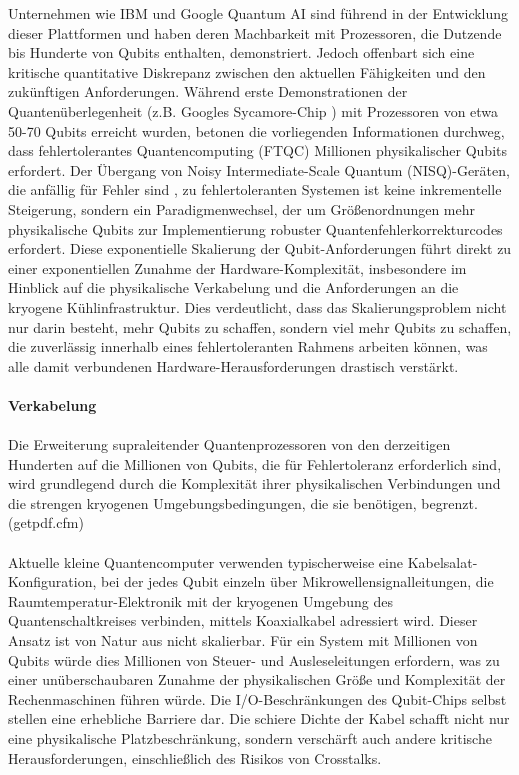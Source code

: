 Unternehmen wie IBM und Google Quantum AI sind führend in der Entwicklung dieser Plattformen und haben deren Machbarkeit mit Prozessoren, die Dutzende bis Hunderte von Qubits enthalten, demonstriert. Jedoch offenbart sich eine kritische quantitative Diskrepanz zwischen den aktuellen Fähigkeiten und den zukünftigen Anforderungen. Während erste Demonstrationen der \glqq Quantenüberlegenheit\grqq{} (z.B. Googles Sycamore-Chip ) mit Prozessoren von etwa 50-70 Qubits erreicht wurden, betonen die vorliegenden Informationen durchweg, dass \glqq fehlertolerantes Quantencomputing\grqq{} (FTQC) \glqq Millionen physikalischer Qubits\grqq{} erfordert. Der Übergang von Noisy Intermediate-Scale Quantum (NISQ)-Geräten, die anfällig für Fehler sind , zu fehlertoleranten Systemen ist keine inkrementelle Steigerung, sondern ein Paradigmenwechsel, der um Größenordnungen mehr physikalische Qubits zur Implementierung robuster Quantenfehlerkorrekturcodes erfordert. Diese exponentielle Skalierung der Qubit-Anforderungen führt direkt zu einer exponentiellen Zunahme der Hardware-Komplexität, insbesondere im Hinblick auf die physikalische Verkabelung und die Anforderungen an die kryogene Kühlinfrastruktur. Dies verdeutlicht, dass das Skalierungsproblem nicht nur darin besteht, mehr Qubits zu schaffen, sondern
viel mehr Qubits zu schaffen, die zuverlässig innerhalb eines fehlertoleranten Rahmens arbeiten können, was alle damit verbundenen Hardware-Herausforderungen drastisch verstärkt.\\\\
\textbf{Verkabelung}\\\\
Die Erweiterung supraleitender Quantenprozessoren von den derzeitigen Hunderten auf die Millionen von Qubits, die für Fehlertoleranz erforderlich sind, wird grundlegend durch die Komplexität ihrer physikalischen Verbindungen und die strengen kryogenen Umgebungsbedingungen, die sie benötigen, begrenzt.(getpdf.cfm)\\\\
Aktuelle kleine Quantencomputer verwenden typischerweise eine \glqq Kabelsalat\grqq{}-Konfiguration, bei der jedes Qubit einzeln über Mikrowellensignalleitungen, die Raumtemperatur-Elektronik mit der kryogenen Umgebung des Quantenschaltkreises verbinden, mittels Koaxialkabel adressiert wird. Dieser Ansatz ist von Natur aus nicht skalierbar. Für ein System mit Millionen von Qubits würde dies Millionen von Steuer- und Ausleseleitungen erfordern, was zu einer unüberschaubaren Zunahme der physikalischen Größe und Komplexität der Rechenmaschinen führen würde. Die I/O-Beschränkungen des Qubit-Chips selbst stellen eine erhebliche Barriere dar. Die schiere Dichte der Kabel schafft nicht nur eine physikalische Platzbeschränkung, sondern verschärft auch andere kritische Herausforderungen, einschließlich des Risikos von Crosstalks.\\\\
